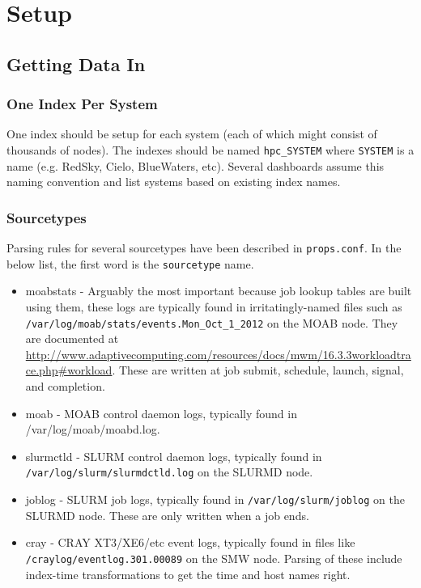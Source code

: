 \section{Setup}

\subsection{Getting Data In}
\subsubsection{One Index Per System}
One index should be setup for each system (each of which might consist of thousands of
nodes).  The indexes should be named {\tt hpc\_SYSTEM} where {\tt SYSTEM} is a
name (e.g. RedSky, Cielo, BlueWaters, etc).  Several dashboards assume this naming
convention and list systems based on existing index names.

\subsubsection{Sourcetypes}
Parsing rules for several sourcetypes have been described in {\tt props.conf}.  In the 
below list, the first word is the {\tt sourcetype} name.
\begin{itemize}
 \item moabstats - Arguably the most important because job lookup tables are
 built using them, these logs are typically found in irritatingly-named files
 such as {\tt /var/log/moab/stats/events.Mon\_Oct\_1\_2012} on the MOAB node.  They are documented
 at \url{http://www.adaptivecomputing.com/resources/docs/mwm/16.3.3workloadtrace.php#workload}.
 These are written at job submit, schedule, launch, signal, and completion.
 \item moab - MOAB control daemon logs, typically found in /var/log/moab/moabd.log.
 \item slurmctld - SLURM control daemon logs, typically found in 
 {\tt /var/log/slurm/slurmdctld.log} on the SLURMD node.
 \item joblog - SLURM job logs, typically found in 
 {\tt /var/log/slurm/joblog} on the SLURMD node.  These are only written when a job ends.
 \item cray - CRAY XT3/XE6/etc event logs, typically found in files like
 {\tt /craylog/eventlog.301.00089} on the SMW node.  Parsing of these include
 index-time transformations to get the time and host names right.
\end{itemize}

